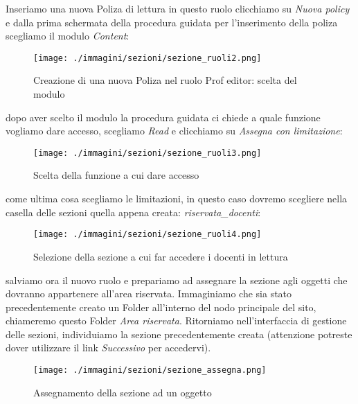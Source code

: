 Inseriamo una nuova Poliza di lettura in questo ruolo clicchiamo su \textsl{Nuova policy} e dalla prima schermata della procedura guidata per l'inserimento della poliza scegliamo il modulo \textsl{Content}:

\begin{figure}[H]
 \centering
 \texttt{[image: ./immagini/sezioni/sezione\_ruoli2.png]}
 \caption{Creazione di una nuova Poliza nel ruolo Prof editor: scelta del modulo}
 \label{fig:sez_modificaruolo2}
\end{figure}

dopo aver scelto il modulo la procedura guidata ci chiede a quale funzione vogliamo dare accesso, scegliamo \textsl{Read} e clicchiamo su \textsl{Assegna con limitazione}:
\begin{figure}[H]
 \centering
 \texttt{[image: ./immagini/sezioni/sezione\_ruoli3.png]}
 \caption{Scelta della funzione a cui dare accesso}
 \label{fig:sez_sezioneruolo3}
\end{figure}

come ultima cosa scegliamo le limitazioni, in questo caso dovremo scegliere nella casella delle sezioni quella appena creata: \textsl{riservata\_docenti}:
\begin{figure}[H]
 \centering
 \texttt{[image: ./immagini/sezioni/sezione\_ruoli4.png]}
 \caption{Selezione della sezione a cui far accedere i docenti in lettura}
 \label{fig:sez_modifcaruolo5}
\end{figure}

salviamo ora il nuovo ruolo e prepariamo ad assegnare la sezione agli oggetti che dovranno appartenere all'area riservata. 
Immaginiamo che sia stato precedentemente creato un Folder all'interno del nodo principale del sito, chiameremo questo Folder \emph{Area riservata}. Ritorniamo nell'interfaccia di gestione delle sezioni, individuiamo la sezione precedentemente creata (attenzione potreste dover utilizzare il link \textsl{Successivo} per accedervi).
\begin{figure}[H]
 \centering
 \texttt{[image: ./immagini/sezioni/sezione\_assegna.png]}
 \caption{Assegnamento della sezione ad un oggetto}
 \label{fig:sez_assegna}
\end{figure}

